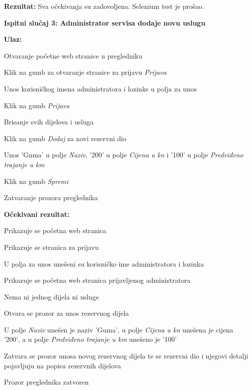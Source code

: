 			\noindent\textbf{Rezultat:} Sva očekivanja su zadovoljena. Selenium test je prošao.
			
			\hfill\break
			\noindent\textbf{Ispitni slučaj 3: Administrator servisa dodaje novu uslugu}
			
			\hfill\break
			\noindent\textbf{Ulaz:}
			
			\begin{packed_enum}
				
				\item Otvaranje početne web stranice u pregledniku
				\item Klik na gumb za otvaranje stranice za prijavu \textit{Prijava}
				\item Unos korisničkog imena administratora i lozinke u polja za unos
				\item Klik na gumb \textit{Prijava}
				\item Brisanje svih dijelova i usluga
				\item Klik na gumb \textit{Dodaj} za novi rezervni dio
				\item Unos 'Guma' u polje \textit{Naziv}, '200' u polje \textit{Cijena u kn} i '100' u polje \textit{Predviđeno trajanje u km}
				\item Klik na gumb \textit{Spremi}
				\item Zatvaranje prozora preglednika
				
			\end{packed_enum}
			
			\noindent\textbf{Očekivani rezultat:}
			
			\begin{packed_enum}
				
				\item Prikazuje se početna web stranica
				\item Prikazuje se stranica za prijavu
				\item U polja za unos unešeni su korisničko ime administratora i lozinka
				\item Prikazuje se početna web stranica prijavljenog administratora
				\item Nema ni jednog dijela ni usluge
				\item Otvara se prozor za unos rezervnog dijela
				\item U polje \textit{Naziv} unešen je naziv 'Guma', u polje \textit{Cijena u kn} unešena je cijena '200', a u polje \textit{Predviđeno trajanje u km} unešeno je '100'
				\item Zatvara se prozor unosa novog rezervnog dijela te se rezervni dio i njegovi detalji pojavljuju na popisu rezervnih dijelova
				\item Prozor preglednika zatvoren
				
			\end{packed_enum}
			
